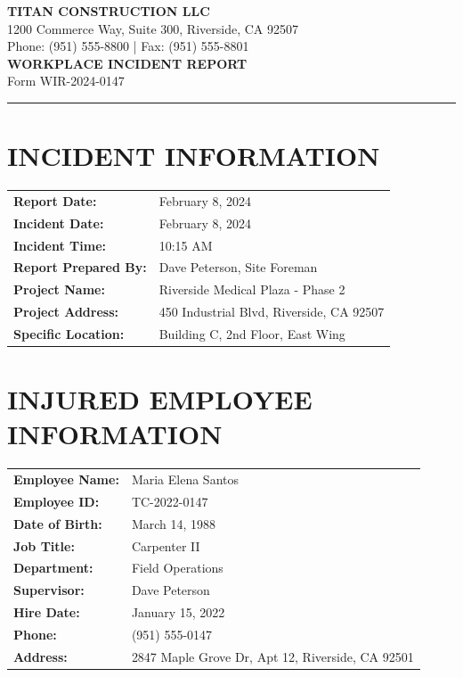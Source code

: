 \documentclass[11pt]{article}
\begin{document}
\begin{center}
{\Large\bfseries\color{titanblue} TITAN CONSTRUCTION LLC}\\[0.3em]
{\small 1200 Commerce Way, Suite 300, Riverside, CA 92507}\\
{\small Phone: (951) 555-8800 | Fax: (951) 555-8801}\\[1.5em]
{\LARGE\bfseries WORKPLACE INCIDENT REPORT}\\[0.5em]
{\large Form WIR-2024-0147}
\end{center}

\vspace{1em}
\hrule
\vspace{1em}

\section*{INCIDENT INFORMATION}

\begin{tabular}{@{}p{4cm}p{10cm}@{}}
\textbf{Report Date:} & February 8, 2024 \\
\textbf{Incident Date:} & February 8, 2024 \\
\textbf{Incident Time:} & 10:15 AM \\
\textbf{Report Prepared By:} & Dave Peterson, Site Foreman \\
\textbf{Project Name:} & Riverside Medical Plaza - Phase 2 \\
\textbf{Project Address:} & 450 Industrial Blvd, Riverside, CA 92507 \\
\textbf{Specific Location:} & Building C, 2nd Floor, East Wing \\
\end{tabular}

\section*{INJURED EMPLOYEE INFORMATION}

\begin{tabular}{@{}p{4cm}p{10cm}@{}}
\textbf{Employee Name:} & Maria Elena Santos \\
\textbf{Employee ID:} & TC-2022-0147 \\
\textbf{Date of Birth:} & March 14, 1988 \\
\textbf{Job Title:} & Carpenter II \\
\textbf{Department:} & Field Operations \\
\textbf{Supervisor:} & Dave Peterson \\
\textbf{Hire Date:} & January 15, 2022 \\
\textbf{Phone:} & (951) 555-0147 \\
\textbf{Address:} & 2847 Maple Grove Dr, Apt 12, Riverside, CA 92501 \\
\end{tabular}
\end{document}
